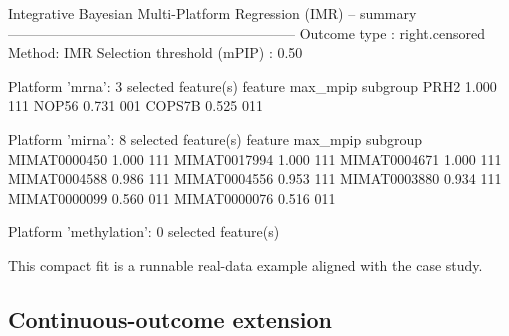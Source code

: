 \documentclass[article]{jss}
\begin{document}
\begin{CodeChunk}
\begin{CodeOutput}
Integrative Bayesian Multi-Platform Regression (IMR) -- summary
--------------------------------------------------------------
Outcome type : right.censored   Method: IMR
Selection threshold (mPIP) : 0.50

Platform 'mrna': 3 selected feature(s)
 feature max_mpip subgroup
    PRH2    1.000      111
   NOP56    0.731      001
  COPS7B    0.525      011

Platform 'mirna': 8 selected feature(s)
      feature max_mpip subgroup
 MIMAT0000450    1.000      111
 MIMAT0017994    1.000      111
 MIMAT0004671    1.000      111
 MIMAT0004588    0.986      111
 MIMAT0004556    0.953      111
 MIMAT0003880    0.934      111
 MIMAT0000099    0.560      011
 MIMAT0000076    0.516      011

Platform 'methylation': 0 selected feature(s)

\end{CodeOutput}
\end{CodeChunk}

This compact fit is a runnable real-data example aligned with the case study.

\subsection{Continuous-outcome extension}\label{sec:appendix-continuous}
\end{document}
